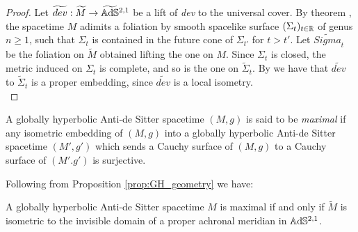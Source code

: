 \begin{proof}
    Let $\widetilde{dev}: \widetilde{M} \to \widetilde{\mathbb{A}\mathrm{d}\mathbb{S}}{}^{2,1}$ be a lift of \textit{dev} to the universal cover. By theorem , the spacetime $M$ adimits a foliation by smooth spacelike surface $(\Sigma_t)_{t\in\mathbb{R}}$ of genus $n\geq 1$, such that $\Sigma_t$ is contained in the future cone of $\Sigma_{t'}$ for $t > t'$. Let $\widetilde{Sigma}_t$ be the foliation on $\widetilde{M}$ obtained lifting the one on $M$. Since $\Sigma_t$ is closed, the metric induced on $\Sigma_t$ is complete, and so is the one on $\widetilde{\Sigma}_t$. By  we have that $\widetilde{dev}$ to $\widetilde{\Sigma}_t$ is a proper embedding, since $\widetilde{dev}$ is a local isometry.\\
\end{proof}
\begin{definition}
    A globally hyperbolic Anti-de Sitter spacetime $(M,g)$ is said to be \textit{maximal} if any isometric embedding of $(M,g)$ into a globally hyperbolic Anti-de Sitter spacetime $(M',g')$ which sends a Cauchy surface of $(M,g)$ to a Cauchy surface of $(M'.g')$ is surjective.
\end{definition}
Following from Proposition \ref{prop:GH_geometry} we have:
\begin{corollary}
    A globally hyperbolic Anti-de Sitter spacetime $M$ is maximal if and only if $\widetilde{M}$ is isometric to the invisible domain of a proper achronal meridian in $\mathbb{A}\mathrm{d}\mathbb{S}^{2,1}$.
\end{corollary}

